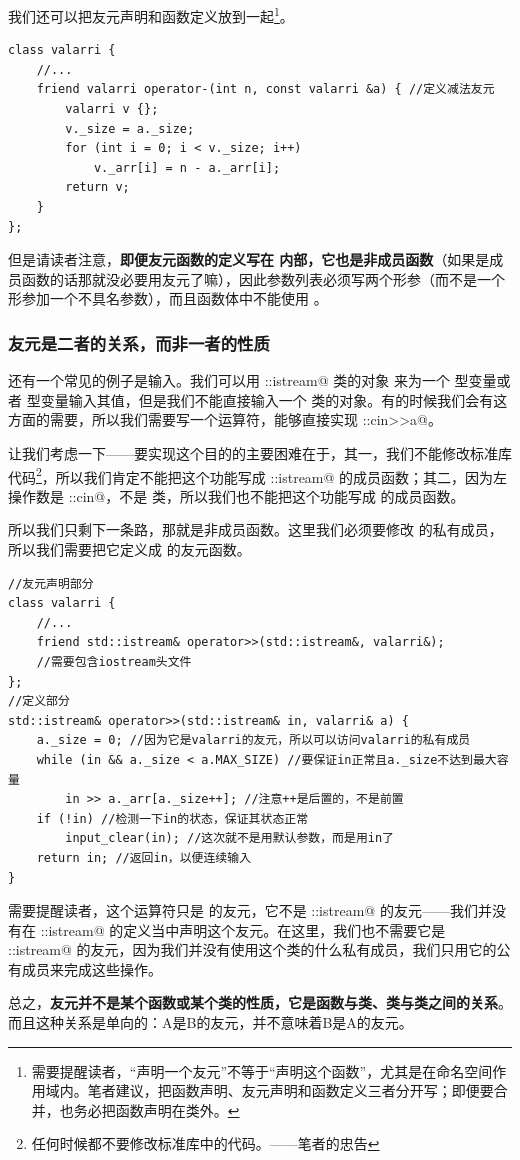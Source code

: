 我们还可以把友元声明和函数定义放到一起\footnote{需要提醒读者，``声明一个友元''不等于``声明这个函数''，尤其是在命名空间作用域内。笔者建议，把函数声明、友元声明和函数定义三者分开写；即便要合并，也务必把函数声明在类外。}。
\begin{lstlisting}
class valarri {
    //...
    friend valarri operator-(int n, const valarri &a) { //定义减法友元
        valarri v {};
        v._size = a._size;
        for (int i = 0; i < v._size; i++)
            v._arr[i] = n - a._arr[i];
        return v;
    }
};
\end{lstlisting}
但是请读者注意，\textbf{即便友元函数的定义写在 \lstinline@class@ 内部，它也是非成员函数}（如果是成员函数的话那就没必要用友元了嘛），因此参数列表必须写两个形参（而不是一个形参加一个不具名参数），而且函数体中不能使用 \lstinline@this@。\par
\subsubsection*{友元是二者的关系，而非一者的性质}
还有一个常见的例子是输入。我们可以用 \lstinline@std::istream@ 类的对象 \lstinline@cin@ 来为一个 \lstinline@int@ 型变量或者 \lstinline@double@ 型变量输入其值，但是我们不能直接输入一个 \lstinline@valarri@ 类的对象。有的时候我们会有这方面的需要，所以我们需要写一个运算符，能够直接实现 \lstinline@std::cin>>a@。\par
让我们考虑一下——要实现这个目的的主要困难在于，其一，我们不能修改标准库代码\footnote{任何时候都不要修改标准库中的代码。——笔者的忠告}，所以我们肯定不能把这个功能写成 \lstinline@std::istream@ 的成员函数；其二，因为左操作数是 \lstinline@std::cin@，不是 \lstinline@valarri@ 类，所以我们也不能把这个功能写成 \lstinline@valarri@ 的成员函数。\par
所以我们只剩下一条路，那就是非成员函数。这里我们必须要修改 \lstinline@valarri@ 的私有成员，所以我们需要把它定义成 \lstinline@valari@ 的友元函数。
\begin{lstlisting}
//友元声明部分
class valarri {
    //...
    friend std::istream& operator>>(std::istream&, valarri&);
    //需要包含iostream头文件
};
//定义部分
std::istream& operator>>(std::istream& in, valarri& a) {
    a._size = 0; //因为它是valarri的友元，所以可以访问valarri的私有成员
    while (in && a._size < a.MAX_SIZE) //要保证in正常且a._size不达到最大容量
        in >> a._arr[a._size++]; //注意++是后置的，不是前置
    if (!in) //检测一下in的状态，保证其状态正常
        input_clear(in); //这次就不是用默认参数，而是用in了
    return in; //返回in，以便连续输入
}
\end{lstlisting}
需要提醒读者，这个运算符只是 \lstinline@valarri@ 的友元，它不是 \lstinline@std::istream@ 的友元——我们并没有在 \lstinline@std::istream@ 的定义当中声明这个友元。在这里，我们也不需要它是 \lstinline@std::istream@ 的友元，因为我们并没有使用这个类的什么私有成员，我们只用它的公有成员来完成这些操作。\par
总之，\textbf{友元并不是某个函数或某个类的性质，它是函数与类、类与类之间的关系}。而且这种关系是单向的：A是B的友元，并不意味着B是A的友元。\par
